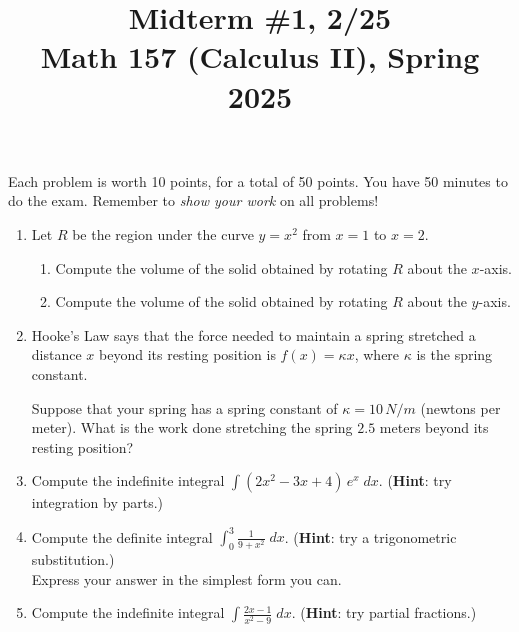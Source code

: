 \documentclass[11pt]{article}
\title{Midterm \#1, 2/25 \\ Math 157 (Calculus II), Spring 2025}
\date{}
\begin{document}
\maketitle

\thispagestyle{empty}

\vspace{-1cm}

Each problem is worth 10 points, for a total of 50 points. You have 50 minutes to do the exam. Remember to \emph{show your work} on all problems!

\begin{enumerate}
\item Let $R$ be the region under the curve $y=x^2$ from $x=1$ to $x=2$. \begin{enumerate}
\item Compute the volume of the solid obtained by rotating $R$ about the $x$-axis.
\item Compute the volume of the solid obtained by rotating $R$ about the $y$-axis.
\end{enumerate}

\item Hooke's Law says that the force needed to maintain a spring stretched a distance $x$ beyond its resting position is $f(x) = \kappa x$, where $\kappa$ is the spring constant. 

Suppose that your spring has a spring constant of $\kappa = 10 \, N/m$ (newtons per meter). What is the work done stretching the spring $2.5$ meters beyond its resting position?

\item Compute the indefinite integral $\displaystyle \int (2x^2-3x+4) \, e^{x} \; dx$. ({\bf Hint}: try integration by parts.)

\item Compute the definite integral $\displaystyle \int_{0}^{3} \frac{1}{9+x^2} \; dx$. ({\bf Hint}: try a trigonometric substitution.) \\ Express your answer in the simplest form you can.

\item Compute the indefinite integral $\displaystyle \int \frac{2x-1}{x^2-9} \; dx$. ({\bf Hint}: try partial fractions.)

\end{enumerate}
\end{document}

